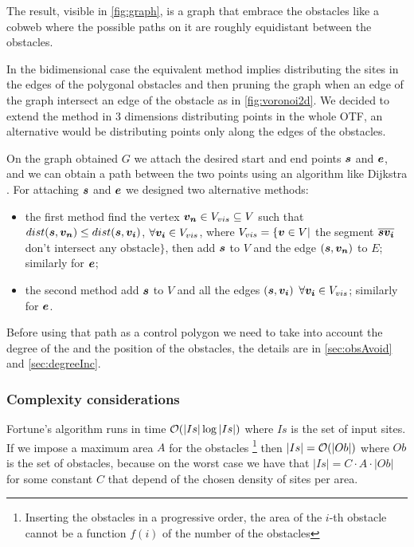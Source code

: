 \documentclass[dissertation.tex]{subfiles}
\begin{document}
The result, visible in \cref{fig:graph}, is a graph that embrace the
obstacles like a cobweb where the possible paths on it are roughly
equidistant between the obstacles.

In the bidimensional case the equivalent method implies distributing
the sites in the edges of the polygonal obstacles and then pruning the
graph when an edge of the graph intersect an edge of the obstacle as
in \cref{fig:voronoi2d}.
We decided to extend the method in 3 dimensions distributing points in
the whole \ac{OTF}, an alternative would be distributing
points only along the edges of the obstacles.

On the graph obtained $G$ we attach the desired start and end
points $\boldsymbol{s}$ and $\boldsymbol{e}$, and we can obtain a path between the two points using an
algorithm like Dijkstra \cite{dijkstra}\cite{knuth}. For attaching $\boldsymbol{s}$
and $\boldsymbol{e}$ we designed two
alternative methods:
\begin{itemize}
\item the first method find the vertex $\boldsymbol{v_n}\in V_{vis}\subseteq V$ such
  that $dist(\boldsymbol{s},\boldsymbol{v_n})\leq dist(\boldsymbol{s},\boldsymbol{v_i})$, $\forall \boldsymbol{v_i}\in V_{vis}$, where
  $V_{vis}=\{\boldsymbol{v}\in V |$ the segment $\overline{\boldsymbol{s} \boldsymbol{v_i}}$ don't intersect
  any obstacle$\}$, then add $\boldsymbol{s}$ to $V$ and the edge $(\boldsymbol{s},\boldsymbol{v_n})$ to $E$;
  similarly for $\boldsymbol{e}$;
\item the second method add $\boldsymbol{s}$ to $V$ and all the edges $(\boldsymbol{s},\boldsymbol{v_i})$
  $\forall \boldsymbol{v_i}\in V_{vis}$; similarly for $\boldsymbol{e}$.
\end{itemize}

Before using that path as a control polygon
we need to take into account the degree of the \bs and the
position of the obstacles, the details are in \cref{sec:obsAvoid} and
\cref{sec:degreeInc}.

\subsubsection{Complexity considerations}
Fortune's algorithm runs in time $\mathcal{O}(|Is|\log |Is|)$ \cite{deberg}
where $Is$ is
the set 
of input sites. If we impose a maximum area $A$ for the obstacles
\footnote{Inserting the obstacles in a progressive order, the area of the $i$-th
obstacle cannot be a function $f(i)$ of the number of
the obstacles} then $|Is|=\mathcal{O}(|Ob|)$ where $Ob$ is the set of
obstacles, because on the worst case we have that $|Is|=C\cdot A\cdot
|Ob|$ for
some constant $C$ that depend of the chosen density of sites per area.
\end{document}
